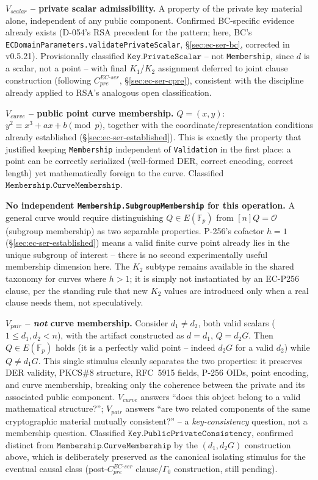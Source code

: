 \documentclass[11pt,a4paper]{article}
\begin{document}
\textbf{$V_{scalar}$ -- private scalar admissibility.} A property of the private key material alone, independent of any public component. Confirmed BC-specific evidence already exists (D-054's RSA precedent for the pattern; here, BC's \texttt{ECDomainParameters.validatePrivateScalar}, \S\ref{sec:ec-ser-bc}, corrected in v0.5.21). Provisionally classified $\texttt{Key.PrivateScalar}$ -- not \texttt{Membership}, since $d$ is a scalar, not a point -- with final $K_1$/$K_2$ assignment deferred to joint clause construction (following $C_{pre}^{EC\text{-}ser}$, \S\ref{sec:ec-ser-cpre}), consistent with the discipline already applied to RSA's analogous open classification.

\textbf{$V_{curve}$ -- public point curve membership.} $Q=(x,y)$: $y^2\equiv x^3+ax+b\pmod p$, together with the coordinate/representation conditions already established (\S\ref{sec:ec-ser-established}). This is exactly the property that justified keeping \texttt{Membership} independent of \texttt{Validation} in the first place: a point can be correctly serialized (well-formed DER, correct encoding, correct length) yet mathematically foreign to the curve. Classified $\texttt{Membership.CurveMembership}$.

\textbf{No independent \texttt{Membership.SubgroupMembership} for this operation.} A general curve would require distinguishing $Q\in E(\mathbb{F}_p)$ from $[n]Q=\mathcal{O}$ (subgroup membership) as two separable properties. P-256's cofactor $h=1$ (\S\ref{sec:ec-ser-established}) means a valid finite curve point already lies in the unique subgroup of interest -- there is no second experimentally useful membership dimension here. The $K_2$ subtype remains available in the shared taxonomy for curves where $h>1$; it is simply not instantiated by an EC-P256 clause, per the standing rule that new $K_2$ values are introduced only when a real clause needs them, not speculatively.

\textbf{$V_{pair}$ -- \emph{not} curve membership.} Consider $d_1\neq d_2$, both valid scalars ($1\le d_1,d_2<n$), with the artifact constructed as $d=d_1$, $Q=d_2 G$. Then $Q\in E(\mathbb{F}_p)$ holds (it is a perfectly valid point -- indeed $d_2G$ for a valid $d_2$) while $Q\neq d_1 G$. This single stimulus cleanly separates the two properties: it preserves DER validity, PKCS\#8 structure, RFC~5915 fields, P-256 OIDs, point encoding, and curve membership, breaking only the coherence between the private and its associated public component. $V_{curve}$ answers ``does this object belong to a valid mathematical structure?''; $V_{pair}$ answers ``are two related components of the same cryptographic material mutually consistent?'' -- a \emph{key-consistency} question, not a membership question. Classified $\texttt{Key.PublicPrivateConsistency}$, confirmed distinct from $\texttt{Membership.CurveMembership}$ by the $(d_1,d_2G)$ construction above, which is deliberately preserved as the canonical isolating stimulus for the eventual causal class (post-$C_{pre}^{EC\text{-}ser}$ clause/$\Gamma_0$ construction, still pending).
\end{document}
